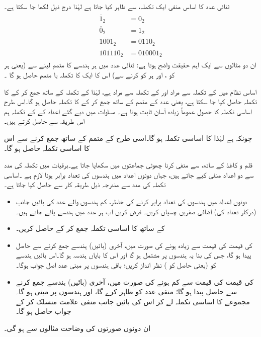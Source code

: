  ثنائی عدد  کا اساس منفی ایک  تکملہ،  سے ظاہر کیا جاتا ہے لہٰذا درج ذیل لکھا جا سکتا ہے۔
\begin{gather}
\begin{aligned}
\overline{1}_2&=0_2\\
\overline{0}_2&=1_2\\
\overline{1001}_2&=0110_2\\
\overline{101110}_2&=010001_2
\end{aligned}
\end{gather}
ان دو مثالوں سے ایک اہم حقیقت واضح ہوتا ہے: ثنائی عدد میں ہر ہندسے کا متمم لینے سے (یعنی ہر  کو ، اور ہر  کو  کرنے سے) اس کا ایک کا تکملہ یا متمم حاصل ہو گا ۔


 اساس  نظام میں  کے تکملہ سے مراد  اور  کے تکملہ سے مراد  ہے، لہٰذا  کے تکملہ کے ساتھ  جمع کر کے  کا تکملہ حاصل کیا جا سکتا ہے، یعنی عدد کے متمم کے ساتھ  جمع کر کے  کا تکملہ حاصل ہو گا۔اس طرح اساسی تکملہ کا حصول عموماً زیادہ آسان ثابت ہوتا ہے۔ مساوات  میں دیے گئے اعداد کے  کے تکملہ ہم اس طریقہ سے حاصل کرتے ہیں۔
 
چونکہ  ہے لہٰذا  کا اساسی تکملہ  ہو گا۔اسی طرح  کے متمم  کے ساتھ  جمع کرنے سے اس کا اساسی تکملہ  حاصل ہو گا۔

قلم و کاغذ کے ساتھ،  سے  منفی کرنا چھوٹی جماعتوں میں سکھایا جاتا ہے۔برقیات میں تکملہ کی مدد سے دو اعداد منفی کیے جاتے ہیں، جہاں دونوں اعداد میں ہندسوں کی تعداد برابر ہونا لازم ہے ۔اساسی تکملہ کی مدد سے  مندرجہ ذیل طریقہ کار سے حاصل کیا جاتا ہے۔
\begin{itemize}
 \item
 دونوں اعداد میں ہندسوں کی تعداد برابر کرنے کی خاطر، کم ہندسوں والے عدد کی بائیں جانب (درکار تعداد کی) اضافی صفریں چسپاں کریں۔ فرض کریں اب ہر عدد میں  ہندسے پائے جاتے ہیں۔ 
 \item
  کے ساتھ  کا اساسی تکملہ جمع کر کے   حاصل کریں۔
 \item
  کی قیمت  کی قیمت سے زیادہ ہونے کی صورت میں، آخری (بائیں) ہندسے جمع کرنے سے حاصل  پیدا ہو گا، جس کی بنا یہ   ہندسوں پر مشتمل ہو گا اور اس کا بایاں ہندسہ  ہو گا۔اس بائیں ہندسے کو (یعنی حاصل  کو ) نظر انداز کریں؛ باقی  ہندسوں پر مبنی عدد اصل جواب ہوگا۔
 \item
{}کی قیمت  کی قیمت سے کم ہونے کی صورت میں، آخری (بائیں) ہندسے جمع کرنے سے حاصل  پیدا  ہو گا؛  منفی عدد کو ظاہر کرے گا، اور  ہندسوں پر مبنی ہو گا۔مجموعے کا اساسی تکملہ لے کر اس کی بائیں جانب منفی علامت منسلک کر کے جواب حاصل ہو گا۔
\end{itemize}
ان دونوں صورتوں کی وضاحت مثالوں سے ہو گی۔ 

